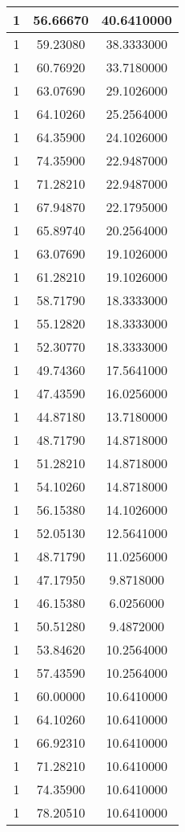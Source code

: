 \documentclass[
]{book}
\begin{document}
\begin{tabular}{c|c|c}
\hline
1 & 56.66670 & 40.6410000\\
\hline
1 & 59.23080 & 38.3333000\\
\hline
1 & 60.76920 & 33.7180000\\
\hline
1 & 63.07690 & 29.1026000\\
\hline
1 & 64.10260 & 25.2564000\\
\hline
1 & 64.35900 & 24.1026000\\
\hline
1 & 74.35900 & 22.9487000\\
\hline
1 & 71.28210 & 22.9487000\\
\hline
1 & 67.94870 & 22.1795000\\
\hline
1 & 65.89740 & 20.2564000\\
\hline
1 & 63.07690 & 19.1026000\\
\hline
1 & 61.28210 & 19.1026000\\
\hline
1 & 58.71790 & 18.3333000\\
\hline
1 & 55.12820 & 18.3333000\\
\hline
1 & 52.30770 & 18.3333000\\
\hline
1 & 49.74360 & 17.5641000\\
\hline
1 & 47.43590 & 16.0256000\\
\hline
1 & 44.87180 & 13.7180000\\
\hline
1 & 48.71790 & 14.8718000\\
\hline
1 & 51.28210 & 14.8718000\\
\hline
1 & 54.10260 & 14.8718000\\
\hline
1 & 56.15380 & 14.1026000\\
\hline
1 & 52.05130 & 12.5641000\\
\hline
1 & 48.71790 & 11.0256000\\
\hline
1 & 47.17950 & 9.8718000\\
\hline
1 & 46.15380 & 6.0256000\\
\hline
1 & 50.51280 & 9.4872000\\
\hline
1 & 53.84620 & 10.2564000\\
\hline
1 & 57.43590 & 10.2564000\\
\hline
1 & 60.00000 & 10.6410000\\
\hline
1 & 64.10260 & 10.6410000\\
\hline
1 & 66.92310 & 10.6410000\\
\hline
1 & 71.28210 & 10.6410000\\
\hline
1 & 74.35900 & 10.6410000\\
\hline
1 & 78.20510 & 10.6410000\\

\end{tabular}
\end{document}
